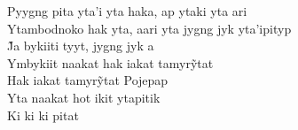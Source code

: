 \begin{linenumbers}

\noindent   Pyygng pita yta'i yta haka, ap ytaki yta ari\\
  Ytambodnoko hak yta, aari yta jygng jyk yta'ipityp\\
  J̃a bykiiti tyyt, jygng jyk a\\
  Ymbykiit naakat hak iakat tamyrỹtat\\
  Hak iakat tamyrỹtat Pojepap\\
  Yta naakat hot ikit ytapitik\\
  Ki ki ki pitat

\end{linenumbers}

\bigskip

